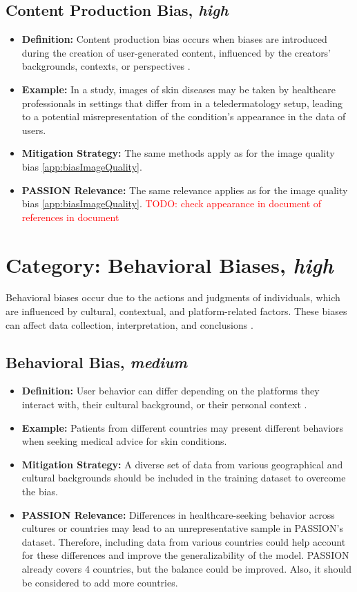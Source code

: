 \documentclass[12pt, a4paper, oneside]{book}   	%
\renewcommand{\todo}[1]{\textcolor{red}{TODO: #1}}
\begin{document}
\begin{appendices}
		\subsection{Content Production Bias, \textit{high}}
		\begin{itemize}
			\item \textbf{Definition:} Content production bias occurs when biases are introduced during the creation of user-generated content, influenced by the creators' backgrounds, contexts, or perspectives \autocite{M120_Olteanu_2019}.
			\item \textbf{Example:} In a study, images of skin diseases may be taken by healthcare professionals in settings that differ from in a \gls{teledermatology} setup, leading to a potential misrepresentation of the condition's appearance in the data of users.
			\item \textbf{Mitigation Strategy:} The same methods apply as for the image quality bias \autoref{app:biasImageQuality}.
			\item \textbf{PASSION Relevance:} The same relevance applies as for the image quality bias \autoref{app:biasImageQuality}.
			\todo{check appearance in document of references in document}
		\end{itemize}
		
		\section{Category: Behavioral Biases, \textit{high}}
		Behavioral biases occur due to the actions and judgments of individuals, which are influenced by cultural, contextual, and platform-related factors. These biases can affect data collection, interpretation, and conclusions \autocite{M120_Olteanu_2019}.
		
		\subsection{Behavioral Bias, \textit{medium}}
		\begin{itemize}
			\item \textbf{Definition:} User behavior can differ depending on the platforms they interact with, their cultural background, or their personal context \autocite{M120_Olteanu_2019}.
			\item \textbf{Example:} Patients from different countries may present different behaviors when seeking medical advice for skin conditions.
			\item \textbf{Mitigation Strategy:} A diverse set of data from various geographical and cultural backgrounds should be included in the training dataset to overcome the bias.
			\item \textbf{PASSION Relevance:} Differences in healthcare-seeking behavior across cultures or countries may lead to an unrepresentative sample in PASSION's dataset. Therefore, including data from various countries could help account for these differences and improve the generalizability of the model. PASSION already covers 4 countries, but the balance could be improved. Also, it should be considered to add more countries.
		\end{itemize}
		

\end{appendices}
\end{document}
